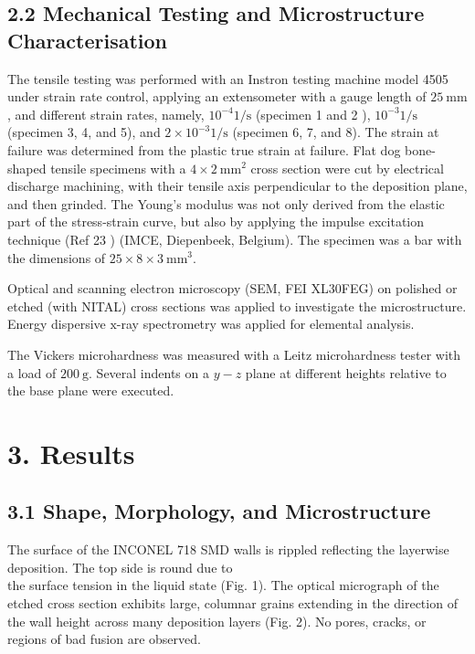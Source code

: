 \documentclass[10pt]{article}
\begin{document}
\subsection*{2.2 Mechanical Testing and Microstructure Characterisation}
The tensile testing was performed with an Instron testing machine model 4505 under strain rate control, applying an extensometer with a gauge length of $25 \mathrm{~mm}$, and different strain rates, namely, $10^{-4} 1 / \mathrm{s}$ (specimen 1 and 2 ), $10^{-3} 1 / \mathrm{s}$ (specimen 3, 4, and 5), and $2 \times 10^{-3} 1 / \mathrm{s}$ (specimen 6, 7, and 8). The strain at failure was determined from the plastic true strain at failure. Flat dog bone-shaped tensile specimens with a $4 \times 2 \mathrm{~mm}^{2}$ cross section were cut by electrical discharge machining, with their tensile axis perpendicular to the deposition plane, and then grinded. The Young's modulus was not only derived from the elastic part of the stress-strain curve, but also by applying the impulse excitation technique (Ref 23 ) (IMCE, Diepenbeek, Belgium). The specimen was a bar with the dimensions of $25 \times 8 \times 3 \mathrm{~mm}^{3}$.

Optical and scanning electron microscopy (SEM, FEI XL30FEG) on polished or etched (with NITAL) cross sections was applied to investigate the microstructure. Energy dispersive $\mathrm{x}$-ray spectrometry was applied for elemental analysis.

The Vickers microhardness was measured with a Leitz microhardness tester with a load of $200 \mathrm{~g}$. Several indents on a $y-z$ plane at different heights relative to the base plane were executed.

\section*{3. Results}
\subsection*{3.1 Shape, Morphology, and Microstructure}
The surface of the INCONEL 718 SMD walls is rippled reflecting the layerwise deposition. The top side is round due to\\
the surface tension in the liquid state (Fig. 1). The optical micrograph of the etched cross section exhibits large, columnar grains extending in the direction of the wall height across many deposition layers (Fig. 2). No pores, cracks, or regions of bad fusion are observed.
\end{document}
